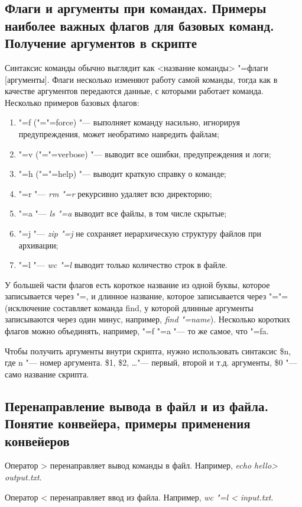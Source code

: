 \documentclass[12pt]{article}
\begin{document}
\subsection{Флаги и аргументы при командах. Примеры наиболее важных флагов для базовых команд. Получение аргументов в скрипте}
Синтаксис команды обычно выглядит как <название команды> "=флаги [аргументы]. Флаги несколько изменяют работу самой команды, тогда как в качестве аргументов передаются данные, с которыми работает команда. Несколько примеров базовых флагов:
\begin{enumerate}
\item "=f ("="=force) "--- выполняет команду насильно, игнорируя предупреждения, может необратимо навредить файлам;
\item "=v ("="=verbose) "--- выводит все ошибки, предупреждения и логи;
\item "=h ("="=help) "--- выводит краткую справку о команде;
\item "=r "--- \textit{rm "=r} рекурсивно удаляет всю директорию;
\item "=a "--- \textit{ls "=a} выводит все файлы, в том числе скрытые;
\item "=j "--- \textit{zip "=j} не сохраняет иерархическую структуру файлов при архивации;
\item "=l "--- \textit{wc "=l} выводит только количество строк в файле.
\end{enumerate}

У большей части флагов есть короткое название из одной буквы, которое записывается через "=, и длинное название, которое записывается через "="= (исключение составляет команда find, у которой длинные аргументы записываются через один минус, например, \textit{find "=name}). Несколько коротких флагов можно объединять, например, "=f "=a "--- то же самое, что "=fa.

Чтобы получить аргументы внутри скрипта, нужно использовать синтаксис \$n, где n "--- номер аргумента. \$1, \$2, \dots "--- первый, второй и т.д. аргументы, \$0 "--- само название скрипта.

\subsection{Перенаправление вывода в файл и из файла. Понятие конвейера, примеры применения конвейеров}
Оператор > перенаправляет вывод команды в файл. Например, \textit{echo \glqq hello\grqq > output.txt}.

Оператор < перенаправляет ввод из файла. Например, \textit{wc "=l < input.txt}.
\end{document}
